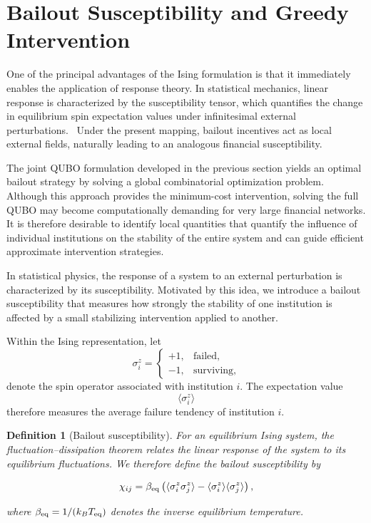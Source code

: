 \documentclass[aps,reprint,superscriptaddress,pra]{revtex4-2}
\newtheorem{definition}{Definition}
\begin{document}
\section{Bailout Susceptibility and Greedy Intervention}
\label{sec:susceptibility}

One of the principal advantages of the Ising formulation is that it immediately enables the application of response theory. In statistical mechanics, linear response is characterized by the susceptibility tensor, which quantifies the change in equilibrium spin expectation values under infinitesimal external perturbations.~\cite{kubo1957statistical} Under the present mapping, bailout incentives act as local external fields, naturally leading to an analogous financial susceptibility.

The joint QUBO formulation developed in the previous section yields an optimal bailout strategy by solving a global combinatorial optimization problem. Although this approach provides the minimum-cost intervention, solving the full QUBO may become computationally demanding for very large financial networks. It is therefore desirable to identify local quantities that quantify the influence of individual institutions on the stability of the entire system and can guide efficient approximate intervention strategies.

In statistical physics, the response of a system to an external perturbation is characterized by its susceptibility. Motivated by this idea, we introduce a bailout susceptibility that measures how strongly the stability of one institution is affected by a small stabilizing intervention applied to another.

Within the Ising representation, let
\begin{equation}
\sigma_i^{z}
=
\begin{cases}
+1,&\text{failed},\\
-1,&\text{surviving},
\end{cases}
\end{equation}
denote the spin operator associated with institution $i$. The expectation value
\begin{equation}
\langle\sigma_i^z\rangle
\end{equation}
therefore measures the average failure tendency of institution $i$.
\begin{definition}[Bailout susceptibility]

For an equilibrium Ising system, the fluctuation--dissipation theorem relates the linear response of the system to its equilibrium fluctuations. We therefore define the bailout susceptibility by

\begin{equation}
\chi_{ij}
=
\beta_{\rm eq}
\left(
\langle
\sigma_i^z\sigma_j^z
\rangle
-
\langle
\sigma_i^z
\rangle
\langle
\sigma_j^z
\rangle
\right),
\label{eq:bailout_susceptibility}
\end{equation}

where $\beta_{\rm eq}=1/(k_BT_{\rm eq})$ denotes the inverse equilibrium temperature.

\end{definition}
\end{document}
